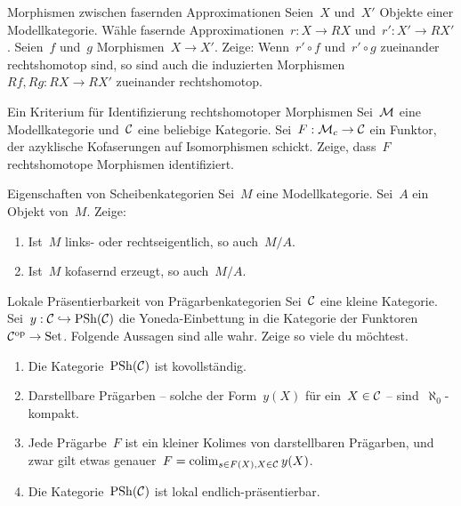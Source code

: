 \documentclass{uebblatt}
\begin{document}

\begin{aufgabe}{Morphismen zwischen fasernden Approximationen}
Seien~$X$ und~$X'$ Objekte einer Modellkategorie. Wähle fasernde
Approximationen~$r : X \to RX$ und~$r' : X' \to RX'$. Seien~$f$ und~$g$
Morphismen~$X \to X'$. Zeige: Wenn~$r' \circ f$ und~$r' \circ g$ zueinander
rechtshomotop sind, so sind auch die induzierten Morphismen~$Rf, Rg : RX \to
RX'$ zueinander rechtshomotop.
\end{aufgabe}

\begin{aufgabe}{Ein Kriterium für Identifizierung rechtshomotoper Morphismen}
Sei~$\mathcal{M}$ eine Modellkategorie und~$\mathcal{C}$ eine beliebige Kategorie. Sei~$F : \mathcal{M}_c
\to \mathcal{C}$ ein Funktor, der azyklische Kofaserungen auf Isomorphismen schickt.
Zeige, dass~$F$ rechtshomotope Morphismen identifiziert.
\end{aufgabe}

\begin{aufgabe}{Eigenschaften von Scheibenkategorien}
Sei~$M$ eine Modellkategorie. Sei~$A$ ein Objekt von~$M$. Zeige:
\begin{enumerate}
\item Ist~$M$ links- oder rechtseigentlich, so auch~$M/A$.
\item Ist~$M$ kofasernd erzeugt, so auch~$M/A$.
\end{enumerate}
\end{aufgabe}

\begin{aufgabe}{Lokale Präsentierbarkeit von Prägarbenkategorien}
Sei~$\mathcal{C}$ eine kleine Kategorie. Sei~$y : \mathcal{C} \hookrightarrow \mathrm{PSh}(\mathcal{C})$ die
Yoneda-Einbettung in die Kategorie der Funktoren~$\mathcal{C}^{\mathrm{op}} \to \mathrm{Set}$.
Folgende Aussagen sind alle wahr. Zeige so viele
du möchtest.
\begin{enumerate}
\item Die Kategorie~$\mathrm{PSh}(\mathcal{C})$ ist kovollständig.
\item Darstellbare Prägarben -- solche der Form~$y(X)$ für ein~$X \in \mathcal{C}$ --
sind~$\aleph_0$-kompakt.
\item Jede Prägarbe~$F$ ist ein kleiner Kolimes von darstellbaren Prägarben,
und zwar gilt etwas genauer~$F = \operatorname*{colim}_{s \in F(X), X \in \mathcal{C}} y(X)$.
\item Die Kategorie~$\mathrm{PSh}(\mathcal{C})$ ist lokal endlich-präsentierbar.
\end{enumerate}
\end{aufgabe}
\end{document}

